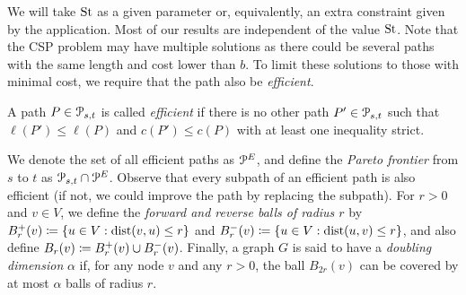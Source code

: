We will take $\operatorname{St}$ as a given parameter or, equivalently, an extra constraint given by the application. 
Most of our results are independent of the value $\operatorname{St}$.
Note that the CSP problem may have multiple solutions as there could be several paths with the same length and cost lower than $b$.
To limit these solutions to those with minimal cost, we require that the path also be \emph{efficient}. 
\begin{definition}
A path $P\in \mathcal{P}_{s,t}$ is called \emph{efficient} if there is no other path $P'\in \mathcal{P}_{s,t}$ such that $\ell(P')\leq \ell(P)$ and $c(P')\leq c(P)$ with at least one inequality strict.
\end{definition}
We denote the set of all efficient paths as $\mathcal{P}^E$, and define the \emph{Pareto frontier} from $s$ to $t$ as $\mathcal{P}_{s,t}\cap\mathcal{P}^E$.
Observe that every subpath of an efficient path is also efficient (if not, we could improve the path by replacing the subpath).
For $r>0$ and $v\in V$, we define the \emph{forward and reverse balls of radius $r$} by $B^+_r(v)\coloneqq\{u\in V: \mbox{dist}(v,u)\leq r\}$ and $B^-_r(v)\coloneqq\{u\in V: \mbox{dist}(u,v)\leq r\}$, and also define $B_r(v)\coloneqq B^+_r(v)\cup B^-_r(v)$.
Finally, a graph $G$ is said to have a \emph{doubling dimension} $\alpha$ if, for any node $v$ and any $r>0$, the ball $B_{2r}(v)$ can be covered by at most $\alpha$ balls of radius $r$. 